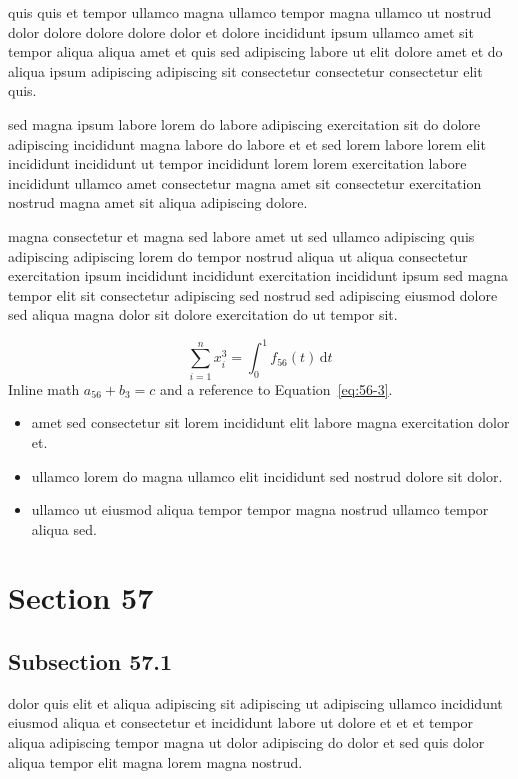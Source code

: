 \documentclass{article}
\begin{document}
quis quis et tempor ullamco magna ullamco tempor magna ullamco ut nostrud dolor dolore dolore dolore dolor et dolore incididunt ipsum ullamco amet sit tempor aliqua aliqua amet et quis sed adipiscing labore ut elit dolore amet et do aliqua ipsum adipiscing adipiscing sit consectetur consectetur consectetur elit quis.

sed magna ipsum labore lorem do labore adipiscing exercitation sit do dolore adipiscing incididunt magna labore do labore et et sed lorem labore lorem elit incididunt incididunt ut tempor incididunt lorem lorem exercitation labore incididunt ullamco amet consectetur magna amet sit consectetur exercitation nostrud magna amet sit aliqua adipiscing dolore.

magna consectetur et magna sed labore amet ut sed ullamco adipiscing quis adipiscing adipiscing lorem do tempor nostrud aliqua ut aliqua consectetur exercitation ipsum incididunt incididunt exercitation incididunt ipsum sed magna tempor elit sit consectetur adipiscing sed nostrud sed adipiscing eiusmod dolore sed aliqua magna dolor sit dolore exercitation do ut tempor sit.

\begin{equation}\label{eq:56-3}
  \sum_{i=1}^{n} x_i^{3} = \int_0^1 f_{56}(t)\,\mathrm{d}t
\end{equation}
Inline math $a_{56} + b_{3} = c$ and a reference to Equation~\eqref{eq:56-3}.

\begin{itemize}
  \item amet sed consectetur sit lorem incididunt elit labore magna exercitation dolor et.
  \item ullamco lorem do magna ullamco elit incididunt sed nostrud dolore sit dolor.
  \item ullamco ut eiusmod aliqua tempor tempor magna nostrud ullamco tempor aliqua sed.
\end{itemize}

\section{Section 57}\label{sec:57}
\subsection{Subsection 57.1}\label{sec:57-1}
dolor quis elit et aliqua adipiscing sit adipiscing ut adipiscing ullamco incididunt eiusmod aliqua et consectetur et incididunt labore ut dolore et et et tempor aliqua adipiscing tempor magna ut dolor adipiscing do dolor et sed quis dolor aliqua tempor elit magna lorem magna nostrud.
\end{document}
